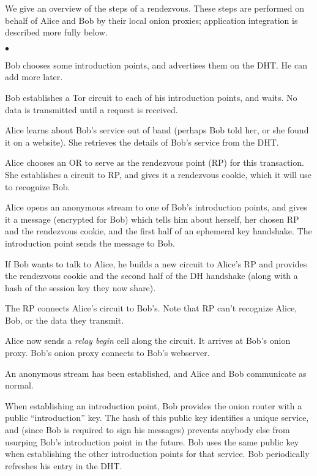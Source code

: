 \documentclass[times,10pt,twocolumn]{article}
\newenvironment{tightlist}{\begin{list}{$\bullet$}{
  \setlength{\itemsep}{0mm}
    \setlength{\parsep}{0mm}
    }}{\end{list}}
\begin{document}
We give an overview of the steps of a rendezvous. These steps are
performed on behalf of Alice and Bob by their local onion proxies;
application integration is described more fully below.
\begin{tightlist}
\item Bob chooses some introduction points, and advertises them on
      the DHT.  He can add more later.
\item Bob establishes a Tor circuit to each of his introduction points,
      and waits.  No data is transmitted until a request is received.
\item Alice learns about Bob's service out of band (perhaps Bob told her,
      or she found it on a website). She retrieves the details of Bob's
      service from the DHT.
\item Alice chooses an OR to serve as the rendezvous point (RP) for this
      transaction. She establishes a circuit to RP, and gives it a
      rendezvous cookie, which it will use to recognize Bob.
\item Alice opens an anonymous stream to one of Bob's introduction
      points, and gives it a message (encrypted for Bob) which tells him
      about herself, her chosen RP and the rendezvous cookie, and the
      first half of an ephemeral
      key handshake. The introduction point sends the message to Bob.
\item If Bob wants to talk to Alice, he builds a new circuit to Alice's
      RP and provides the rendezvous cookie and the second half of the DH
      handshake (along with a hash of the session key they now share).
\item The RP connects Alice's circuit to Bob's. Note that RP can't
      recognize Alice, Bob, or the data they transmit.
\item Alice now sends a \emph{relay begin} cell along the circuit. It
      arrives at Bob's onion proxy. Bob's onion proxy connects to Bob's
      webserver.
\item An anonymous stream has been established, and Alice and Bob
      communicate as normal.
\end{tightlist}

When establishing an introduction point, Bob provides the onion router
with a public ``introduction'' key. The hash of this public key
identifies a unique service, and (since Bob is required to sign his
messages) prevents anybody else from usurping Bob's introduction point
in the future. Bob uses the same public key when establishing the other
introduction points for that service. Bob periodically refreshes his
entry in the DHT.
\end{document}
